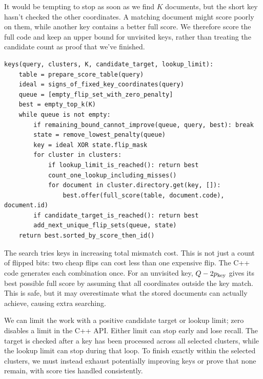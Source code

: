 It would be tempting to stop as soon as we find $K$ documents, but the short key hasn't checked
the other coordinates. A matching document might score poorly on them, while another key
contains a better full score. We therefore score the full code and keep an upper bound for
unvisited keys, rather than treating the candidate count as proof that we've finished.

\begin{lstlisting}[caption={Weighted key lookup. Generate the key sequence once; charge every cluster lookup.}]
keys(query, clusters, K, candidate_target, lookup_limit):
    table = prepare_score_table(query)
    ideal = signs_of_fixed_key_coordinates(query)
    queue = [empty_flip_set_with_zero_penalty]
    best = empty_top_k(K)
    while queue is not empty:
        if remaining_bound_cannot_improve(queue, query, best): break
        state = remove_lowest_penalty(queue)
        key = ideal XOR state.flip_mask
        for cluster in clusters:
            if lookup_limit_is_reached(): return best
            count_one_lookup_including_misses()
            for document in cluster.directory.get(key, []):
                best.offer(full_score(table, document.code), document.id)
        if candidate_target_is_reached(): return best
        add_next_unique_flip_sets(queue, state)
    return best.sorted_by_score_then_id()
\end{lstlisting}

The search tries keys in increasing total mismatch cost. This is not just a count of flipped
bits: two cheap flips can cost less than one expensive flip. The C++ code generates each
combination once. For an unvisited key, $Q-2p_{\rm key}$ gives its best possible full score
by assuming that all coordinates outside the key match. This is safe, but it may overestimate
what the stored documents can actually achieve, causing extra searching.

We can limit the work with a positive candidate target or lookup limit; zero disables a limit
in the C++ API. Either limit can stop early and lose recall. The target is checked after a
key has been processed across all selected clusters, while the lookup limit can stop during
that loop. To finish exactly within the selected clusters, we must instead exhaust potentially
improving keys or prove that none remain, with score ties handled consistently.

